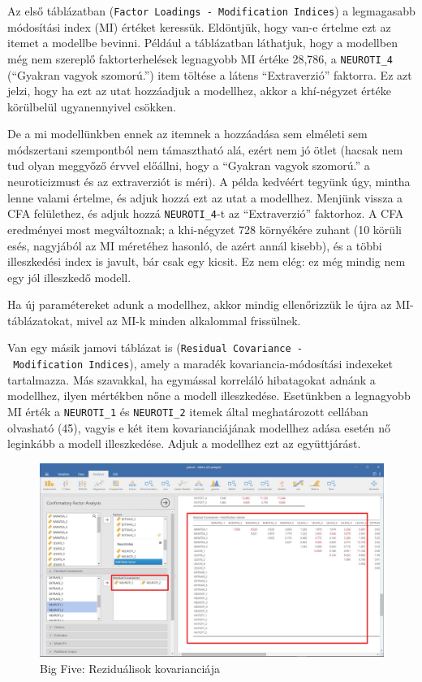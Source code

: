 \documentclass[
  letterpaper,
]{krantz}
\begin{document}
Az első táblázatban
(\texttt{Factor\ Loadings\ -\ Modification\ Indices}) a legmagasabb
módosítási index (MI) értéket keressük. Eldöntjük, hogy van-e értelme
ezt az itemet a modellbe bevinni. Például a táblázatban láthatjuk, hogy
a modellben még nem szereplő faktorterhelések legnagyobb MI értéke
28,786, a \texttt{NEUROTI\_4} (``Gyakran vagyok szomorú.'') item töltése
a látens ``Extraverzió'' faktorra. Ez azt jelzi, hogy ha ezt az utat
hozzáadjuk a modellhez, akkor a khí-négyzet értéke körülbelül
ugyanennyivel csökken.

De a mi modellünkben ennek az itemnek a hozzáadása sem elméleti sem
módszertani szempontból nem támasztható alá, ezért nem jó ötlet (hacsak
nem tud olyan meggyőző érvvel előállni, hogy a ``Gyakran vagyok
szomorú.'' a neuroticizmust és az extraverziót is méri). A példa
kedvéért tegyünk úgy, mintha lenne valami értelme, és adjuk hozzá ezt az
utat a modellhez. Menjünk vissza a CFA felülethez, és adjuk hozzá
\texttt{NEUROTI\_4}-t az ``Extraverzió'' faktorhoz. A CFA eredményei
most megváltoznak; a khi-négyzet 728 környékére zuhant (10 körüli esés,
nagyjából az MI méretéhez hasonló, de azért annál kisebb), és a többi
illeszkedési index is javult, bár csak egy kicsit. Ez nem elég: ez még
mindig nem egy jól illeszkedő modell.

Ha új paramétereket adunk a modellhez, akkor mindig ellenőrizzük le újra
az MI-táblázatokat, mivel az MI-k minden alkalommal frissülnek.

Van egy másik jamovi táblázat is
(\texttt{Residual\ Covariance\ -\ Modification\ Indices}), amely a
maradék kovariancia-módosítási indexeket tartalmazza. Más szavakkal, ha
egymással korreláló hibatagokat adnánk a modellhez, ilyen mértékben nőne
a modell illeszkedése. Esetünkben a legnagyobb MI érték a
\texttt{NEUROTI\_1} és \texttt{NEUROTI\_2} itemek által meghatározott
cellában olvasható (45), vagyis e két item kovarianciájának modellhez
adása esetén nő leginkább a modell illeszkedése. Adjuk a modellhez ezt
az együttjárást.

\begin{figure}

{\centering \includegraphics{./images/cfa_kep_06.jpg}

}

\caption{Big Five: Reziduálisok kovarianciája}

\end{figure}
\end{document}
